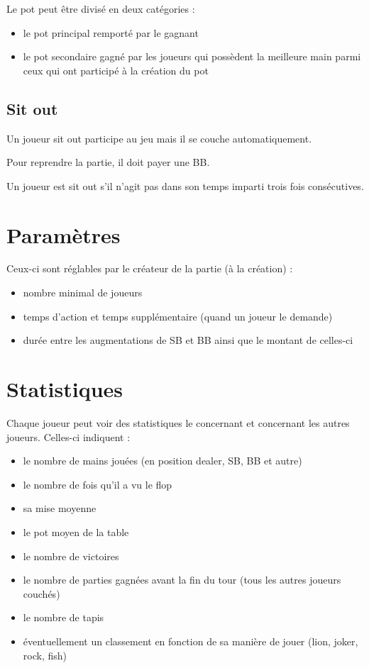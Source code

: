 \documentclass[a4paper]{article}
\begin{document}
Le pot peut être divisé en deux catégories :
\begin{itemize}
	\item le pot principal remporté par le gagnant
	\item le pot secondaire gagné par les joueurs qui possèdent la meilleure main parmi ceux qui ont participé à la création du pot
\end{itemize}

\subsection{Sit out}

Un joueur sit out participe au jeu mais il se couche automatiquement.

Pour reprendre la partie, il doit payer une BB.

Un joueur est sit out s'il n'agit pas dans son temps imparti trois fois consécutives.

\section{Paramètres}

Ceux-ci sont réglables par le créateur de la partie (à la création) :

\begin{itemize}
	\item nombre minimal de joueurs
	\item temps d'action et temps supplémentaire (quand un joueur le demande)
	\item durée entre les augmentations de SB et BB ainsi que le montant de celles-ci
\end{itemize}

\section{Statistiques}

Chaque joueur peut voir des statistiques le concernant et concernant les autres joueurs.
Celles-ci indiquent :
\begin{itemize}
	\item le nombre de mains jouées (en position dealer, SB, BB et autre)
	\item le nombre de fois qu'il a vu le flop
	\item sa mise moyenne
	\item le pot moyen de la table
	\item le nombre de victoires
	\item le nombre de parties gagnées avant la fin du tour (tous les autres joueurs couchés)
	\item le nombre de tapis
	\item éventuellement un classement en fonction de sa manière de jouer (lion, joker, rock, fish)
\end{itemize}
\end{document}
